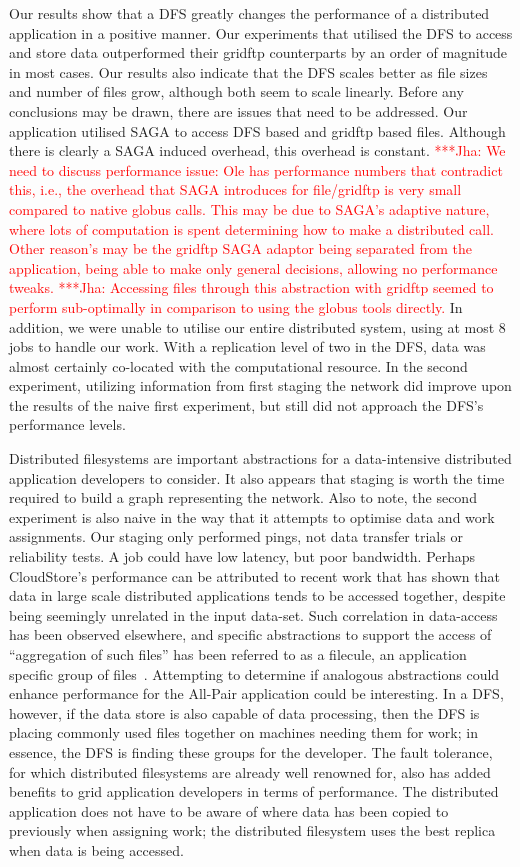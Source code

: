 \documentclass[a4paper,11pt]{article}
\newcommand{\jhanote}[1]{ {\textcolor{red} { ***Jha: #1 }}}
\newcommand{\jhanote}[1]{}
\begin{document}
Our results show that a DFS greatly changes the performance of a distributed application in a positive manner. Our experiments that utilised the DFS to access and store data outperformed their gridftp counterparts by an order of magnitude in most cases. Our results also indicate that the DFS scales better as file sizes and number of files grow, although both seem to scale linearly. Before any conclusions may be drawn, there are issues that need to be addressed. Our application utilised SAGA to access DFS based and gridftp based files. Although there is clearly a SAGA induced overhead, this overhead is constant.  \jhanote{ We need to discuss performance issue: Ole has performance numbers that contradict this, i.e., the overhead that SAGA introduces for file/gridftp is very small compared to native globus calls. This may be due to SAGA's adaptive nature, where lots of computation is spent determining how to make a distributed call. Other reason's may be the gridftp SAGA adaptor being separated from the application, being able to make only general decisions, allowing no performance tweaks. } \jhanote{Accessing files through this abstraction with gridftp seemed to perform sub-optimally in comparison to using the globus tools directly.} In addition, we were unable to utilise our entire distributed system, using at most 8 jobs to handle our work. With a replication level of two in the DFS, data was almost certainly co-located with the computational resource. In the second experiment, utilizing information from first staging the network did improve upon the results of the naive first experiment, but still did not approach the DFS's performance levels.

Distributed filesystems are important abstractions for a data-intensive distributed application developers to consider. It also appears that staging is worth the time required to build a graph representing the network. Also to note, the second experiment is also naive in the way that it attempts to optimise data and work assignments. Our staging only performed pings, not data transfer trials or reliability tests. A job could have low latency, but poor bandwidth. Perhaps CloudStore's performance can be attributed to recent work that has shown that data in large scale distributed applications tends to be accessed together, despite being seemingly unrelated in the input data-set. Such correlation in data-access
has been observed elsewhere, and specific abstractions to support the
access of ``aggregation of such files'' has been referred to as a filecule, an application specific group of files~\cite{filecule}. Attempting to determine 
if analogous abstractions could enhance performance for the All-Pair application could be interesting.  In a DFS, however, if the data store is also capable of data processing, then the DFS is placing commonly used files together on machines needing them for work; in essence, the DFS is finding these groups for the developer. The fault tolerance, for which distributed filesystems are already well renowned for, also has added benefits to grid application developers in terms of performance. The distributed application does not have to be aware of where data has been copied to previously when assigning work; the distributed filesystem uses the best replica when data is being accessed.
\end{document}
